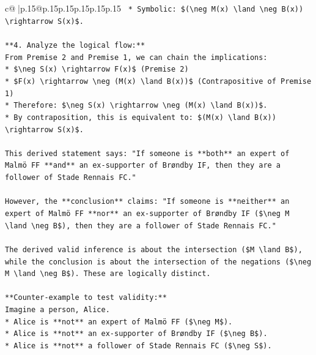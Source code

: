 \documentclass{article}
\begin{document}
{\begin{supertabular}{c@{$\;$}|p{.15\linewidth}@{}p{.15\linewidth}p{.15\linewidth}p{.15\linewidth}p{.15\linewidth}p{.15\linewidth}}
{{{\texttt{    *   Symbolic: \$(\textbackslash{}neg M(x) \textbackslash{}land \textbackslash{}neg B(x)) \textbackslash{}rightarrow S(x)\$.} \\
\\ 
\texttt{**4. Analyze the logical flow:**} \\
\texttt{From Premise 2 and Premise 1, we can chain the implications:} \\
\texttt{*   \$\textbackslash{}neg S(x) \textbackslash{}rightarrow F(x)\$ (Premise 2)} \\
\texttt{*   \$F(x) \textbackslash{}rightarrow \textbackslash{}neg (M(x) \textbackslash{}land B(x))\$ (Contrapositive of Premise 1)} \\
\texttt{*   Therefore: \$\textbackslash{}neg S(x) \textbackslash{}rightarrow \textbackslash{}neg (M(x) \textbackslash{}land B(x))\$.} \\
\texttt{*   By contraposition, this is equivalent to: \$(M(x) \textbackslash{}land B(x)) \textbackslash{}rightarrow S(x)\$.} \\
\\ 
\texttt{This derived statement says: "If someone is **both** an expert of Malmö FF **and** an ex{-}supporter of Brøndby IF, then they are a follower of Stade Rennais FC."} \\
\\ 
\texttt{However, the **conclusion** claims: "If someone is **neither** an expert of Malmö FF **nor** an ex{-}supporter of Brøndby IF (\$\textbackslash{}neg M \textbackslash{}land \textbackslash{}neg B\$), then they are a follower of Stade Rennais FC."} \\
\\ 
\texttt{The derived valid inference is about the intersection (\$M \textbackslash{}land B\$), while the conclusion is about the intersection of the negations (\$\textbackslash{}neg M \textbackslash{}land \textbackslash{}neg B\$). These are logically distinct.} \\
\\ 
\texttt{**Counter{-}example to test validity:**} \\
\texttt{Imagine a person, Alice.} \\
\texttt{*   Alice is **not** an expert of Malmö FF (\$\textbackslash{}neg M\$).} \\
\texttt{*   Alice is **not** an ex{-}supporter of Brøndby IF (\$\textbackslash{}neg B\$).} \\
\texttt{*   Alice is **not** a follower of Stade Rennais FC (\$\textbackslash{}neg S\$).} \\
}}}
\end{supertabular}}
\end{document}
